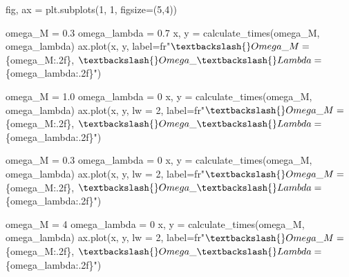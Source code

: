 \documentclass[
  letterpaper,
  DIV=11,
  numbers=noendperiod]{scrreprt}
\newenvironment{Shaded}{\begin{snugshade}}{\end{snugshade}}
\newcommand{\DecValTok}[1]{\textcolor[rgb]{0.68,0.00,0.00}{#1}}
\newcommand{\FloatTok}[1]{\textcolor[rgb]{0.68,0.00,0.00}{#1}}
\newcommand{\NormalTok}[1]{\textcolor[rgb]{0.00,0.23,0.31}{#1}}
\newcommand{\OperatorTok}[1]{\textcolor[rgb]{0.37,0.37,0.37}{#1}}
\newcommand{\SpecialCharTok}[1]{\textcolor[rgb]{0.37,0.37,0.37}{#1}}
\newcommand{\VerbatimStringTok}[1]{\textcolor[rgb]{0.13,0.47,0.30}{#1}}
\begin{document}
\begin{tcolorbox}[enhanced jigsaw, toprule=.15mm, colframe=quarto-callout-color-frame, bottomrule=.15mm, leftrule=.75mm, left=2mm, breakable, rightrule=.15mm, arc=.35mm, opacityback=0, colback=white]
\begin{Shaded}
\begin{Highlighting}[]
\NormalTok{fig, ax }\OperatorTok{=}\NormalTok{ plt.subplots(}\DecValTok{1}\NormalTok{, }\DecValTok{1}\NormalTok{, figsize}\OperatorTok{=}\NormalTok{(}\DecValTok{5}\NormalTok{,}\DecValTok{4}\NormalTok{))}

\NormalTok{omega\_M }\OperatorTok{=} \FloatTok{0.3}
\NormalTok{omega\_lambda }\OperatorTok{=} \FloatTok{0.7}
\NormalTok{x, y }\OperatorTok{=}\NormalTok{ calculate\_times(omega\_M, omega\_lambda)}
\NormalTok{ax.plot(x, y, label}\OperatorTok{=}\VerbatimStringTok{fr"$\textbackslash{}Omega\_M =$ }\SpecialCharTok{\{}\NormalTok{omega\_M}\SpecialCharTok{:.2f\}}\VerbatimStringTok{, $\textbackslash{}Omega\_\textbackslash{}Lambda =$ }\SpecialCharTok{\{}\NormalTok{omega\_lambda}\SpecialCharTok{:.2f\}}\VerbatimStringTok{"}\NormalTok{)}

\NormalTok{omega\_M }\OperatorTok{=} \FloatTok{1.0}
\NormalTok{omega\_lambda }\OperatorTok{=} \DecValTok{0}
\NormalTok{x, y }\OperatorTok{=}\NormalTok{ calculate\_times(omega\_M, omega\_lambda)}
\NormalTok{ax.plot(x, y, lw }\OperatorTok{=} \DecValTok{2}\NormalTok{, label}\OperatorTok{=}\VerbatimStringTok{fr"$\textbackslash{}Omega\_M =$ }\SpecialCharTok{\{}\NormalTok{omega\_M}\SpecialCharTok{:.2f\}}\VerbatimStringTok{, $\textbackslash{}Omega\_\textbackslash{}Lambda =$ }\SpecialCharTok{\{}\NormalTok{omega\_lambda}\SpecialCharTok{:.2f\}}\VerbatimStringTok{"}\NormalTok{)}

\NormalTok{omega\_M }\OperatorTok{=} \FloatTok{0.3}
\NormalTok{omega\_lambda }\OperatorTok{=} \DecValTok{0}
\NormalTok{x, y }\OperatorTok{=}\NormalTok{ calculate\_times(omega\_M, omega\_lambda)}
\NormalTok{ax.plot(x, y, lw }\OperatorTok{=} \DecValTok{2}\NormalTok{, label}\OperatorTok{=}\VerbatimStringTok{fr"$\textbackslash{}Omega\_M =$ }\SpecialCharTok{\{}\NormalTok{omega\_M}\SpecialCharTok{:.2f\}}\VerbatimStringTok{, $\textbackslash{}Omega\_\textbackslash{}Lambda =$ }\SpecialCharTok{\{}\NormalTok{omega\_lambda}\SpecialCharTok{:.2f\}}\VerbatimStringTok{"}\NormalTok{)}

\NormalTok{omega\_M }\OperatorTok{=} \DecValTok{4}
\NormalTok{omega\_lambda }\OperatorTok{=} \DecValTok{0}
\NormalTok{x, y }\OperatorTok{=}\NormalTok{ calculate\_times(omega\_M, omega\_lambda)}
\NormalTok{ax.plot(x, y, lw }\OperatorTok{=} \DecValTok{2}\NormalTok{, label}\OperatorTok{=}\VerbatimStringTok{fr"$\textbackslash{}Omega\_M =$ }\SpecialCharTok{\{}\NormalTok{omega\_M}\SpecialCharTok{:.2f\}}\VerbatimStringTok{, $\textbackslash{}Omega\_\textbackslash{}Lambda =$ }\SpecialCharTok{\{}\NormalTok{omega\_lambda}\SpecialCharTok{:.2f\}}\VerbatimStringTok{"}\NormalTok{)}



\end{Highlighting}
\end{Shaded}
\end{tcolorbox}
\end{document}
